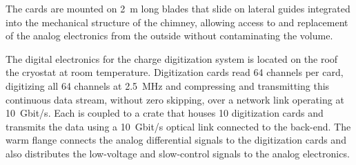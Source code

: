 The  cards are mounted on \SI{2}{m} long blades that slide on lateral guides integrated into the mechanical structure of the chimney, allowing access to and replacement of the analog  electronics from the outside without contaminating the  volume. 

The digital electronics for the charge digitization system %
is located 
on the roof the cryostat at room temperature. %
%
Digitization cards read \num{64} channels per card, digitizing all  \num{64} channels at \SI{2.5}{MHz} and compressing and transmitting this continuous data stream, without zero skipping, over a network link operating at \SI{10}{Gbit/s}. 
Each  is coupled to a  crate that houses  \num{10}  digitization cards and  transmits the data %
using a \SI{10}{Gbit/s} optical link connected to the  back-end. %
The  warm flange connects the analog differential signals %
to the %
digitization cards and also distributes the low-voltage and slow-control signals to the analog  electronics.  

